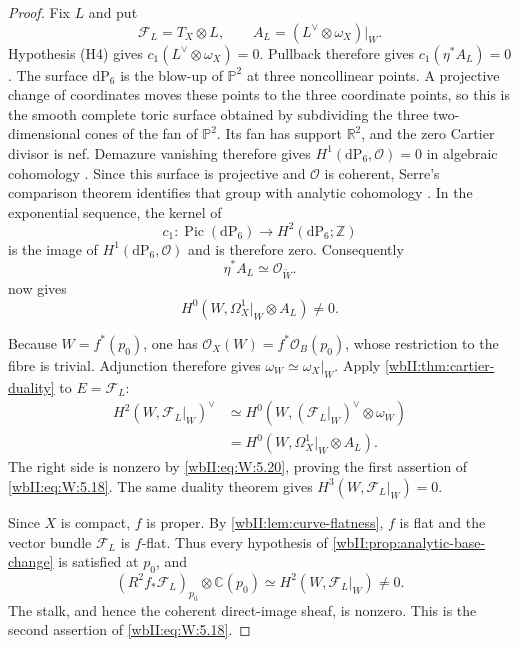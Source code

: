 \begin{proof}
Fix $L$ and put
\[
\mathcal F_L=T_X\otimes L,\qquad
A_L=(L^\vee\otimes\omega_X)|_W.
\]
Hypothesis (H4) gives $c_1(L^\vee\otimes\omega_X)=0$.  Pullback therefore
gives $c_1(\eta^*A_L)=0$. The surface $\mathrm{dP}_6$ is the blow-up of
$\mathbb P^2$ at three noncollinear points. A projective change of coordinates
moves these points to the three coordinate points, so this is the smooth
complete toric surface obtained by subdividing the three two-dimensional
cones of the fan of $\mathbb P^2$. Its fan has support $\mathbb R^2$,
and the zero Cartier divisor is nef. Demazure vanishing therefore gives
$H^1(\mathrm{dP}_6,\mathcal O)=0$ in algebraic cohomology
\cite[Theorem~9.2.3, author preprint p.~410]{CoxLittleSchenck2011}.
Since this surface is projective and $\mathcal O$ is coherent,
Serre's comparison theorem identifies that group with analytic cohomology
\cite[\S12, Theorem~1, p.~19]{Serre1956GAGA}.
In the exponential sequence, the kernel
of
\[
c_1:\operatorname{Pic}(\mathrm{dP}_6)\longrightarrow
H^2(\mathrm{dP}_6;\mathbb Z)
\]
is the image of $H^1(\mathrm{dP}_6,\mathcal O)$ and is therefore zero.
Consequently
\[
\eta^*A_L\simeq\mathcal O_{\widetilde W}.
\tag{W.46}\label{wbII:eq:W:5.19}
\]
 now gives
\[
H^0(W,\Omega^1_X|_W\otimes A_L)\ne0.
\tag{W.47}\label{wbII:eq:W:5.20}
\]

Because $W=f^*(p_0)$, one has
$\mathcal O_X(W)=f^*\mathcal O_B(p_0)$, whose restriction to the fibre is
trivial.  Adjunction therefore gives $\omega_W\simeq\omega_X|_W$.
Apply \cref{wbII:thm:cartier-duality} to $E=\mathcal F_L$:
\[
\begin{split}
H^2(W,\mathcal F_L|_W)^\vee
&\simeq H^0(W,(\mathcal F_L|_W)^\vee\otimes\omega_W)\\
&=H^0(W,\Omega^1_X|_W\otimes A_L).
\end{split}
\]
The right side is nonzero by \eqref{wbII:eq:W:5.20}, proving the first assertion of \eqref{wbII:eq:W:5.18}.
The same duality theorem gives
$H^3(W,\mathcal F_L|_W)=0$.

Since $X$ is compact, $f$ is proper.  By
\cref{wbII:lem:curve-flatness}, $f$ is flat and the vector bundle
$\mathcal F_L$ is $f$-flat.  Thus every hypothesis of
\cref{wbII:prop:analytic-base-change} is satisfied at $p_0$, and
\[
(R^2f_*\mathcal F_L)_{p_0}\otimes\mathbb C(p_0)
\simeq H^2(W,\mathcal F_L|_W)\ne0.
\]
The stalk, and hence the coherent direct-image sheaf, is nonzero.  This is
the second assertion of \eqref{wbII:eq:W:5.18}.
\end{proof}


